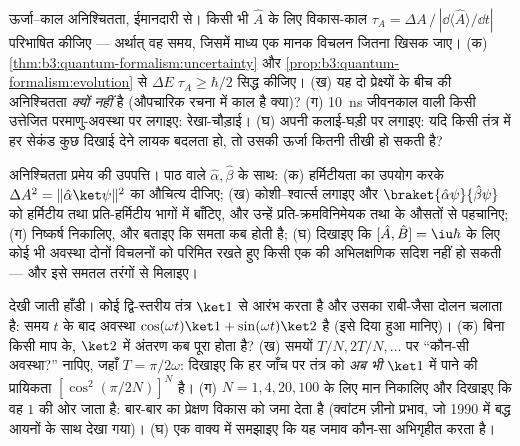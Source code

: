 \begin{exercise}[$\star\star\star$]\label{exo:b3:quantum-formalism:10}
ऊर्जा--काल अनिश्चितता, ईमानदारी से। किसी भी  $\hat A$ के लिए
विकास-काल $\tau_A = \Delta A\,/\,|\dd\langle\hat
A\rangle/\dd t|$ परिभाषित कीजिए --- अर्थात् वह समय, जिसमें माध्य एक
मानक विचलन जितना खिसक जाए। (क) \cref{thm:b3:quantum-formalism:uncertainty} और
\cref{prop:b3:quantum-formalism:evolution} से $\Delta
E\;\tau_A \ge \hbar/2$ सिद्ध कीजिए। (ख) यह दो प्रेक्ष्यों के बीच की
अनिश्चितता \emph{क्यों नहीं} है (औपचारिक रचना में काल है क्या)? (ग)
\qty{10}{ns} जीवनकाल वाली किसी उत्तेजित परमाणु-अवस्था पर लगाइए:
रेखा-चौड़ाई। (घ) अपनी कलाई-घड़ी पर लगाइए: यदि किसी तंत्र में हर सेकंड
कुछ दिखाई देने लायक बदलता हो, तो उसकी ऊर्जा कितनी तीखी हो सकती है?
\end{exercise}

\begin{exercise}[$\star\star\star$]\label{exo:b3:quantum-formalism:11}
अनिश्चितता प्रमेय की उपपत्ति। पाठ वाले $\hat\alpha, \hat\beta$ के साथ:
(क) हर्मिटीयता का उपयोग करके $\Delta A^2 = \|\hat\alpha\ket\psi\|^2$
का औचित्य दीजिए; (ख) कोशी--श्वार्त्स लगाइए और
$\braket{\hat\alpha\psi}{\hat\beta\psi}$ को हर्मिटीय तथा
प्रति-हर्मिटीय भागों में बाँटिए, और उन्हें प्रति-क्रमविनिमेयक तथा
 के औसतों से पहचानिए; (ग) निष्कर्ष निकालिए, और बताइए कि
समता कब होती है; (घ) दिखाइए कि $[\hat A, \hat B] = \iu\hbar$ के लिए
कोई भी अवस्था दोनों विचलनों को परिमित रखते हुए किसी एक  की
अभिलक्षणिक सदिश नहीं हो सकती --- और इसे समतल तरंगों से मिलाइए।
\end{exercise}

\begin{exercise}[$\star\star\star$]\label{exo:b3:quantum-formalism:12}
देखी जाती हाँडी। कोई द्वि-स्तरीय तंत्र $\ket1$ से आरंभ करता है और
उसका  राबी-जैसा दोलन चलाता है: समय $t$ के बाद अवस्था
$\cos(\omega t)\ket1 + \sin(\omega t)\ket2$ है (इसे दिया हुआ मानिए)।
(क) बिना किसी माप के, $\ket2$ में अंतरण कब पूरा होता है?
(ख) समयों $T/N, 2T/N, \dots$ पर ``कौन-सी अवस्था?'' नापिए, जहाँ $T =
\pi/2\omega$: दिखाइए कि हर जाँच पर तंत्र को
\emph{अब भी} $\ket1$ में पाने की प्रायिकता $[\cos^2(\pi/2N)]^N$ है। (ग)
$N = 1, 4, 20, 100$ के लिए मान निकालिए और दिखाइए कि वह $1$ की ओर जाता
है: बार-बार का प्रेक्षण विकास को जमा देता है (क्वांटम ज़ीनो प्रभाव,
जो 1990 में बद्ध आयनों के साथ देखा गया)। (घ) एक वाक्य में समझाइए कि
यह जमाव कौन-सा अभिगृहीत करता है।
\end{exercise}

